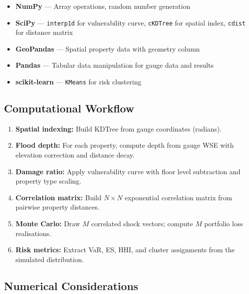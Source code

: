\documentclass[11pt,a4paper]{article}
\begin{document}
\begin{itemize}[nosep]
    \item \textbf{NumPy} --- Array operations, random number generation
    \item \textbf{SciPy} --- \texttt{interp1d} for vulnerability curve,
          \texttt{cKDTree} for spatial index, \texttt{cdist} for distance matrix
    \item \textbf{GeoPandas} --- Spatial property data with geometry column
    \item \textbf{Pandas} --- Tabular data manipulation for gauge data and results
    \item \textbf{scikit-learn} --- \texttt{KMeans} for risk clustering
\end{itemize}

\subsection{Computational Workflow}

\begin{enumerate}[nosep]
    \item \textbf{Spatial indexing:} Build KDTree from gauge coordinates (radians).
    \item \textbf{Flood depth:} For each property, compute depth from gauge WSE with
          elevation correction and distance decay.
    \item \textbf{Damage ratio:} Apply vulnerability curve with floor level subtraction
          and property type scaling.
    \item \textbf{Correlation matrix:} Build $N \times N$ exponential correlation matrix
          from pairwise property distances.
    \item \textbf{Monte Carlo:} Draw $M$ correlated shock vectors; compute $M$ portfolio
          loss realisations.
    \item \textbf{Risk metrics:} Extract VaR, ES, HHI, and cluster assignments from the
          simulated distribution.
\end{enumerate}

\subsection{Numerical Considerations}
\end{document}
